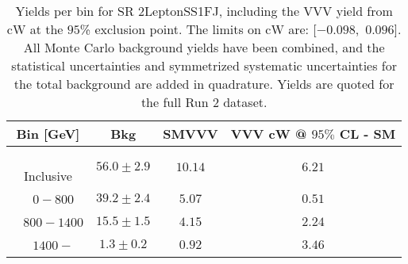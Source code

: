 \begin{table}[!htbp]
    \small
    \center
    \begin{tabular}{c||c|c|c}
    Bin [GeV] & Bkg & SMVVV & \pbox{20cm}{VVV \\ cW @ $95\%$ CL - SM \\ }\\
    \hline
    \pbox{20cm}{ ~ \\Inclusive\\ } & $56.0 \pm 2.9$ & $10.14$ & $6.21$\\
    \hline
    \pbox{20cm}{ ~ \\$0-800$\\ } & $39.2 \pm 2.4$ & $5.07$ & $0.51$\\
    \hline
    \pbox{20cm}{ ~ \\$800-1400$\\ } & $15.5 \pm 1.5$ & $4.15$ & $2.24$\\
    \hline
    \pbox{20cm}{ ~ \\$1400-$\\ } & $1.3 \pm 0.2$ & $0.92$ & $3.46$\\
\end{tabular}
    \caption{Yields per bin for SR 2LeptonSS1FJ, including the VVV yield from cW at the $95$\% exclusion point. The limits on cW are: [$-0.098$,~$0.096$]. All Monte Carlo background yields have been combined, and the statistical uncertainties and symmetrized systematic uncertainties for the total background are added in quadrature. Yields are quoted for the full Run 2 dataset.}
    \label{tab:2LeptonSS1FJ$binssignal}
\end{table}
